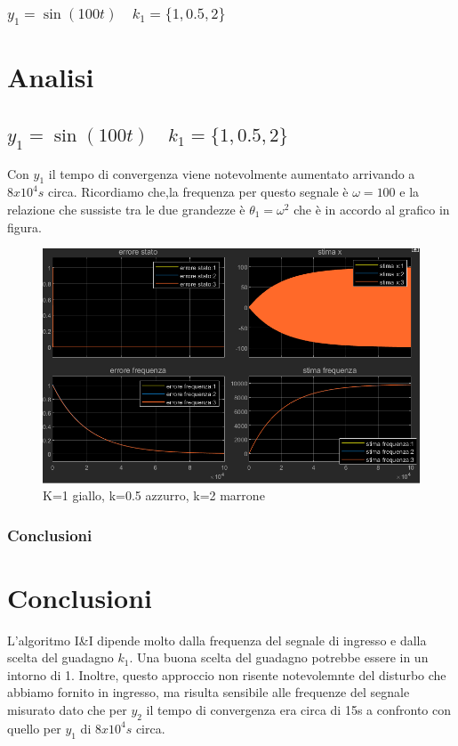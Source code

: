 \documentclass{beamer}
\begin{document}
\begin{frame}
    \frametitle{\(y_{1}=\sin(100t)\quad k_{1}=\{1,0.5,2\}\)}
    \section{Analisi}
    \subsection{\(y_{1}=\sin(100t)\quad k_{1}=\{1,0.5,2\}\)}
    \begin{minipage}[t]{0.5\textwidth}
        \small
        Con \(y_{1}\) il tempo di convergenza viene notevolmente aumentato arrivando a \(8x10^{4}s\) circa. Ricordiamo che,la frequenza per questo segnale è \(\omega=100\) e la relazione che sussiste tra le due grandezze è \(\theta_{1}=\omega^2\) che è in accordo al grafico in figura.
    \end{minipage}\hspace{0.5cm}
    \begin{minipage}[t]{0.4\textwidth}
        \begin{figure}
            \includegraphics[scale=0.25]{2022-05-15-19-19-53.png}%
            \caption{K=1 giallo, k=0.5 azzurro, k=2 marrone}
        \end{figure}
    \end{minipage}
\end{frame}
\begin{frame}
    \frametitle{Conclusioni}
    \section{Conclusioni}
    L'algoritmo I\&I dipende molto dalla frequenza del segnale di ingresso e dalla scelta del guadagno \(k_1\).\newline
    Una buona scelta del guadagno potrebbe essere in un intorno di 1.\newline
    Inoltre, questo approccio non risente notevolemnte del disturbo che abbiamo fornito in ingresso, ma risulta sensibile alle frequenze del segnale misurato dato che per \(y_2\) il tempo di convergenza era circa di 15s a confronto con quello per \(y_1\) di \(8x10^{4}s\) circa.
\end{frame}
\end{document}
